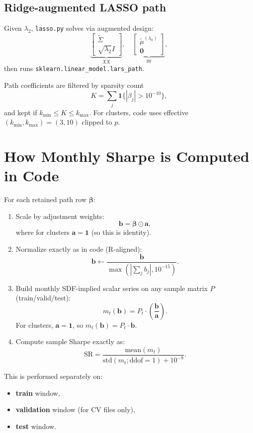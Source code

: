 ﻿\documentclass[11pt]{article}
\begin{document}
\subsection{Ridge-augmented LASSO path}
Given $\lambda_2$, \texttt{lasso.py} solves via augmented design:
\[
\underbrace{\begin{bmatrix}\tilde\Sigma\\ \sqrt{\lambda_2}I\end{bmatrix}}_{XX},
\quad
\underbrace{\begin{bmatrix}\tilde\mu^{(\lambda_0)}\\ \mathbf 0\end{bmatrix}}_{yy},
\]
then runs \texttt{sklearn.linear\_model.lars\_path}.

Path coefficients are filtered by sparsity count
\[
K=\sum_j \mathbf 1\{|\beta_j|>10^{-10}\},
\]
and kept if $k_{\min}\le K\le k_{\max}$.
For clusters, code uses effective $(k_{\min},k_{\max})=(3,10)$ clipped to $p$.

\section{How Monthly Sharpe is Computed in Code}
For each retained path row $\bm\beta$:
\begin{enumerate}[label=(\alph*)]
  \item Scale by adjustment weights:
  \[
  \bm b = \bm\beta\odot \bm a,
  \]
  where for clusters $\bm a=\mathbf 1$ (so this is identity).

  \item Normalize exactly as in code (R-aligned):
  \[
  \bm b \leftarrow \frac{\bm b}{\max(|\sum_j b_j|,10^{-15})}.
  \]

  \item Build monthly SDF-implied scalar series on any sample matrix $P$ (train/valid/test):
  \[
  m_t(\bm b)=P_t\cdot\left(\frac{\bm b}{\bm a}\right).
  \]
  For clusters, $\bm a=\mathbf 1$, so $m_t(\bm b)=P_t\cdot\bm b$.

  \item Compute sample Sharpe exactly as:
  \[
  \mathrm{SR}=\frac{\mathrm{mean}(m_t)}{\mathrm{std}(m_t;\mathrm{ddof}=1)+10^{-8}}.
  \]
\end{enumerate}

This is performed separately on:
\begin{itemize}
  \item \textbf{train} window,
  \item \textbf{validation} window (for CV files only),
  \item \textbf{test} window.
\end{itemize}
\end{document}
